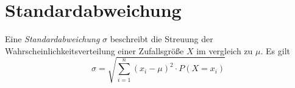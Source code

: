 \documentclass{article}
\begin{document}
\section{Standardabweichung}
Eine \emph{Standardabweichung} $\sigma$ beschreibt die Streuung der Wahrscheinlichkeitsverteilung einer Zufallsgröße $X$ im vergleich zu $\mu$. Es gilt
\[
 \sigma = \sqrt{\sum_{i=1}^n (x_i - \mu)^2 \cdot P(X=x_i)}
\]
\end{document}
